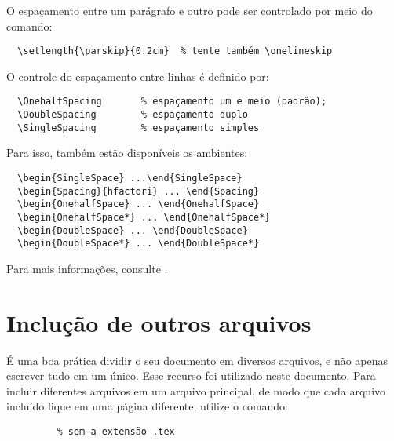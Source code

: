 O espaçamento entre um parágrafo e outro pode ser controlado por meio do comando:
\begin{verbatim}
  \setlength{\parskip}{0.2cm}  % tente também \onelineskip
\end{verbatim}

O controle do espaçamento entre linhas é definido por:
\begin{verbatim}
  \OnehalfSpacing       % espaçamento um e meio (padrão);
  \DoubleSpacing        % espaçamento duplo
  \SingleSpacing        % espaçamento simples
\end{verbatim}

Para isso, também estão disponíveis os ambientes:
\begin{verbatim}
  \begin{SingleSpace} ...\end{SingleSpace}
  \begin{Spacing}{hfactori} ... \end{Spacing}
  \begin{OnehalfSpace} ... \end{OnehalfSpace}
  \begin{OnehalfSpace*} ... \end{OnehalfSpace*}
  \begin{DoubleSpace} ... \end{DoubleSpace}
  \begin{DoubleSpace*} ... \end{DoubleSpace*}
\end{verbatim}

Para mais informações, consulte .


\section{Inclução de outros arquivos}\label{sec:include}

É uma boa prática dividir o seu documento em diversos arquivos, e não apenas escrever tudo em um único.
  Esse recurso foi utilizado neste documento.
  Para incluir diferentes arquivos em um arquivo principal, de modo que cada arquivo incluído fique em uma página diferente, utilize o comando:
\begin{verbatim}
         % sem a extensão .tex
\end{verbatim}

